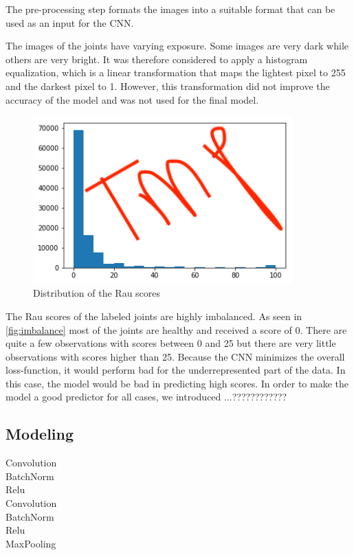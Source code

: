 \documentclass[12pt]{article}
\begin{document}
The pre-processing step formats the images into a suitable format that can be used as an input for the CNN. 

The images of the joints have varying exposure. Some images are very dark while others are very bright. It was therefore considered to apply a histogram equalization, which is a linear transformation that maps the lightest pixel to 255 and the darkest pixel to 1. However, this transformation did not improve the accuracy of the model and was not used for the final model.

\begin{figure}[ht]
\includegraphics[width=10cm]{imbalance}	
\caption{Distribution of the Rau scores}
\label{fig:imbalance}
\end{figure}

The Rau scores of the labeled joints are highly imbalanced. As seen in \autoref{fig:imbalance} most of the joints are healthy and received a score of 0. There are quite a few observations with scores between 0 and 25 but there are very little observations with scores higher than 25. Because the CNN minimizes the overall loss-function, it would perform bad for the underrepresented part of the data. In this case, the model would be bad in predicting high scores. In order to make the model a good predictor for all cases, we introduced ...????????????


\subsection{Modeling}

Convolution\\
BatchNorm\\
Relu\\
Convolution\\
BatchNorm\\
Relu\\
MaxPooling\\
\end{document}
